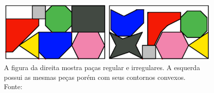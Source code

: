 \begin{figure}[!htb]
    \centering
    \includegraphics[scale=0.7]{utils/images/pieces-example}
    \caption{A figura da direita mostra paças regular e irregulares. A esquerda possui as mesmas peças porém com seus contornos convexos.\\ Fonte:\cite{aprendizado-reforco}}
    \label{fig:pieces-example}
\end{figure}
